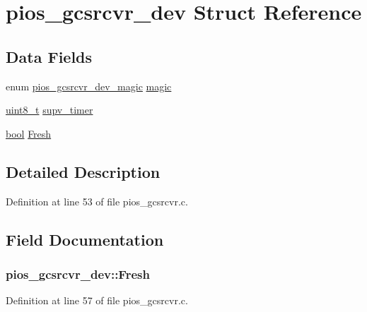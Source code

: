 \hypertarget{structpios__gcsrcvr__dev}{\section{pios\-\_\-gcsrcvr\-\_\-dev Struct Reference}
\label{structpios__gcsrcvr__dev}
}
\subsection*{Data Fields}
\begin{DoxyCompactItemize}
\item 
enum \hyperlink{group___p_i_o_s___g_c_s_r_c_v_r_ga88de96a8f2cf14a06395b79f0996c923}{pios\-\_\-gcsrcvr\-\_\-dev\-\_\-magic} \hyperlink{structpios__gcsrcvr__dev_a39049abd66fd252962f3a7ce9d14c3f7}{magic}
\item 
\hyperlink{stdint_8h_aba7bc1797add20fe3efdf37ced1182c5}{uint8\-\_\-t} \hyperlink{structpios__gcsrcvr__dev_a3f792c850523f7eba7efbb0aeebeba37}{supv\-\_\-timer}
\item 
\hyperlink{group___exported__types_gaf6a258d8f3ee5206d682d799316314b1}{bool} \hyperlink{structpios__gcsrcvr__dev_a1f2f772ea9bb9487b52dc3b3bf679694}{Fresh}
\end{DoxyCompactItemize}


\subsection{Detailed Description}


Definition at line 53 of file pios\-\_\-gcsrcvr.\-c.



\subsection{Field Documentation}
\hypertarget{structpios__gcsrcvr__dev_a1f2f772ea9bb9487b52dc3b3bf679694}{
\subsubsection[{Fresh}]{ pios\-\_\-gcsrcvr\-\_\-dev\-::\-Fresh}}\label{structpios__gcsrcvr__dev_a1f2f772ea9bb9487b52dc3b3bf679694}


Definition at line 57 of file pios\-\_\-gcsrcvr.\-c.

